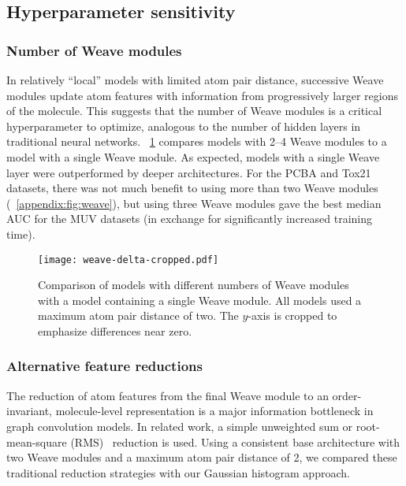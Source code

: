 \subsection{Hyperparameter sensitivity}
\label{sec:hyperparameter_sensitivity}

\subsubsection{Number of Weave modules}

In relatively ``local'' models with limited atom pair distance, successive Weave
modules update atom features with information from progressively larger regions
of the molecule. This suggests that the number of Weave modules is a critical
hyperparameter to optimize, analogous to the number of hidden layers in
traditional neural networks. \figurename~\ref{fig:weave_delta} compares models
with 2--4 Weave modules to a model with a single Weave module. As expected,
models with a single Weave layer were outperformed by deeper architectures.
For the PCBA and Tox21 datasets, there was not much benefit to using more than
two Weave modules (\figurename~\ref{appendix:fig:weave}), but using
three Weave modules gave the best median AUC for the MUV datasets (in exchange
for significantly increased training time).

\begin{figure}[tb]
\centering
  \texttt{[image: weave-delta-cropped.pdf]}
  \caption{
    Comparison of models with different numbers of Weave modules with a model
    containing a single Weave module. All models used a maximum atom pair
    distance of two. The $y$-axis is cropped to emphasize differences near zero.
  }
  \label{fig:weave_delta}
\end{figure}

\subsubsection{Alternative feature reductions}

The reduction of atom features from the final Weave module to an
order-invariant, molecule-level representation is a major information bottleneck
in graph convolution models. In related work, a simple unweighted sum
\citep{duvenaud2015convolutional, merkwirth2005automatic,
lusci2013deep} or root-mean-square (RMS)~\citep{dieleman2015classifying}
reduction is used. Using a consistent base architecture with two Weave modules
and a maximum atom pair distance of 2, we
compared these traditional reduction strategies with our Gaussian histogram approach.

